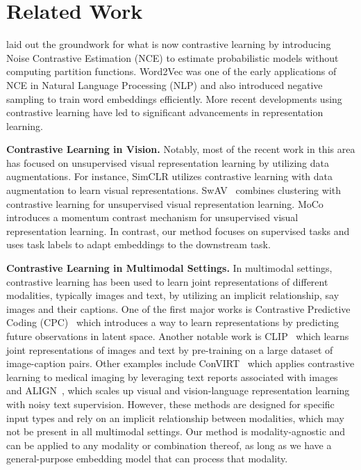 \section{Related Work}
\cite{gutmann_noise-contrastive_2010} laid out the groundwork for what is now contrastive learning by introducing Noise Contrastive Estimation (NCE) to estimate probabilistic models without computing partition functions. 
Word2Vec \citep{mikolov2013efficient} was one of the early applications of NCE in Natural Language Processing (NLP) and also introduced negative sampling to train word embeddings efficiently.
More recent developments using contrastive learning have led to significant advancements in representation learning. 

\textbf{Contrastive Learning in Vision.}
Notably, most of the recent work in this area has focused on unsupervised visual representation learning by utilizing data augmentations.
For instance, SimCLR \citep{chen_simple_2020} utilizes contrastive learning with data augmentation to learn visual representations. 
SwAV~\cite{caron_unsupervised_2020} combines clustering with contrastive learning for unsupervised visual representation learning. 
MoCo~\cite{he_momentum_2020} introduces a momentum contrast mechanism for unsupervised visual representation learning. 
In contrast, our method focuses on supervised tasks and uses task labels to adapt embeddings to the downstream task.

\textbf{Contrastive Learning in Multimodal Settings.}
In multimodal settings, contrastive learning has been used to learn joint representations of different modalities, typically images and text, by utilizing an implicit relationship, say images and their captions.
One of the first major works is Contrastive Predictive Coding (CPC)~\cite{oord_representation_2019} which introduces a way to learn representations by predicting future observations in latent space. 
Another notable work is CLIP~\cite{radford2021learning} which learns joint representations of images and text by pre-training on a large dataset of image-caption pairs. Other examples include ConVIRT~\cite{zhang_contrastive_2022} which applies contrastive learning to medical imaging by leveraging text reports associated with images and ALIGN~\cite{jia_scaling_2021}, which scales up visual and vision-language representation learning with noisy text supervision. However, these methods are designed for specific input types and rely on an implicit relationship between modalities, which may not be present in all multimodal settings. Our method is modality-agnostic and can be applied to any modality or combination thereof, as long as we have a general-purpose embedding model that can process that modality.

